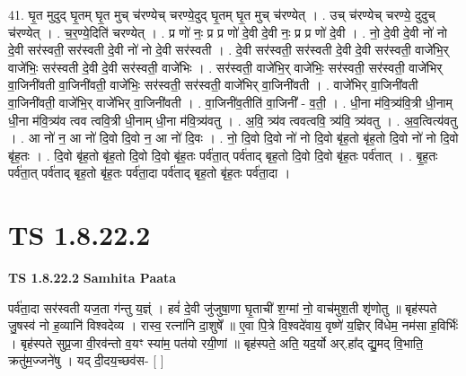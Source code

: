 \documentclass[17pt]{extarticle}
\begin{document}
41. घृ॒त मुदुद् घृ॒तम् घृ॒त मुच् च॑रण्येच् चरण्ये॒दुद् घृ॒तम् घृ॒त मुच् च॑रण्येत् । . उच् च॑रण्येच् चरण्ये॒ दुदुच् च॑रण्येत् । . च॒र॒ण्ये॒दिति॑ चरण्येत् । . प्र णो॑ नः॒ प्र प्र णो॑ दे॒वी दे॒वी नः॒ प्र प्र णो॑ दे॒वी । . नो॒ दे॒वी दे॒वी नो॑ नो दे॒वी सर॑स्वती॒ सर॑स्वती दे॒वी नो॑ नो दे॒वी सर॑स्वती । . दे॒वी सर॑स्वती॒ सर॑स्वती दे॒वी दे॒वी सर॑स्वती॒ वाजे॑भि॒र् वाजे॑भिः॒ सर॑स्वती दे॒वी दे॒वी सर॑स्वती॒ वाजे॑भिः । . सर॑स्वती॒ वाजे॑भि॒र् वाजे॑भिः॒ सर॑स्वती॒ सर॑स्वती॒ वाजे॑भिर् वा॒जिनी॑वती वा॒जिनी॑वती॒ वाजे॑भिः॒ सर॑स्वती॒ सर॑स्वती॒ वाजे॑भिर् वा॒जिनी॑वती । . वाजे॑भिर् वा॒जिनी॑वती वा॒जिनी॑वती॒ वाजे॑भि॒र् वाजे॑भिर् वा॒जिनी॑वती । . वा॒जिनी॑व॒तीति॑ वा॒जिनी᳚ - व॒ती॒ । . धी॒ना म॑वि॒त्र्य॑वि॒त्री धी॒नाम् धी॒ना म॑वि॒त्र्य॑व त्वव त्ववि॒त्री धी॒नाम् धी॒ना म॑वि॒त्र्य॑वतु । . अ॒वि॒ त्र्य॑व त्ववत्ववि॒ त्र्य॑वि॒ त्र्य॑वतु । . अ॒व॒त्वित्य॑वतु । . आ नो॑ न॒ आ नो॑ दि॒वो दि॒वो न॒ आ नो॑ दि॒वः । . नो॒ दि॒वो दि॒वो नो॑ नो दि॒वो बृ॑ह॒तो बृ॑ह॒तो दि॒वो नो॑ नो दि॒वो बृ॑ह॒तः । . दि॒वो बृ॑ह॒तो बृ॑ह॒तो दि॒वो दि॒वो बृ॑ह॒तः पर्व॑ता॒त् पर्व॑ताद् बृह॒तो दि॒वो दि॒वो बृ॑ह॒तः पर्व॑तात् । . बृ॒ह॒तः पर्व॑ता॒त् पर्व॑ताद् बृह॒तो बृ॑ह॒तः पर्व॑ता॒दा पर्व॑ताद् बृह॒तो बृ॑ह॒तः पर्व॑ता॒दा । \newline
\pagebreak
{}

\section{ TS 1.8.22.2 }

\textbf{TS 1.8.22.2 } \newline
\textbf{Samhita Paata} \newline

पर्व॑ता॒दा सर॑स्वती यज॒ता ग॑न्तु य॒ज्ञ्ं । हवं॑ दे॒वी जु॑जुषा॒णा घृ॒ताची॑ श॒ग्मां नो॒ वाच॑मुश॒ती शृ॑णोतु ॥ बृह॑स्पते जु॒षस्व॑ नो ह॒व्यानि॑ विश्वदेव्य । रास्व॒ रत्ना॑नि दा॒शुषे᳚ ॥ ए॒वा पि॒त्रे वि॒श्वदे॑वाय॒ वृष्णे॑ य॒ज्ञिर् वि॑धेम॒ नम॑सा ह॒विर्भिः॑ । बृह॑स्पते सुप्र॒जा वी॒रव॑न्तो व॒यꣳ स्या॑म॒ पत॑यो रयी॒णां ॥ बृह॑स्पते॒ अति॒ यद॒र्यो अर्.हा᳚द् द्यु॒मद् वि॒भाति॒ क्रतु॑म॒ज्जने॑षु । यद् दी॒दय॒च्छव॑स- [ ] \newline
\end{document}
